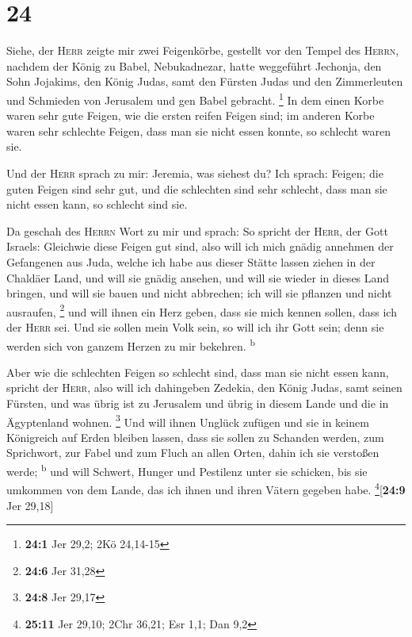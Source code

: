 \hypertarget{section-23}{%
\section{24}\label{section-23}}

 Siehe, der \textsc{Herr} zeigte mir zwei Feigenkörbe,
gestellt vor den Tempel des \textsc{Herrn}, nachdem der König zu Babel,
Nebukadnezar, hatte weggeführt Jechonja, den Sohn Jojakims, den König
Judas, samt den Fürsten Judas und den Zimmerleuten und Schmieden von
Jerusalem und gen Babel gebracht. \footnote{\textbf{24:1} Jer 29,2; 2Kö
  24,14-15}  In dem einen Korbe waren sehr gute Feigen,
wie die ersten reifen Feigen sind; im anderen Korbe waren sehr schlechte
Feigen, dass man sie nicht essen konnte, so schlecht waren sie.

 Und der \textsc{Herr} sprach zu mir: Jeremia, was siehest
du? Ich sprach: Feigen; die guten Feigen sind sehr gut, und die
schlechten sind sehr schlecht, dass man sie nicht essen kann, so
schlecht sind sie.

 Da geschah des \textsc{Herrn} Wort zu mir und sprach:
 So spricht der \textsc{Herr}, der Gott Israels: Gleichwie
diese Feigen gut sind, also will ich mich gnädig annehmen der Gefangenen
aus Juda, welche ich habe aus dieser Stätte lassen ziehen in der
Chaldäer Land,  und will sie gnädig ansehen, und will sie
wieder in dieses Land bringen, und will sie bauen und nicht abbrechen;
ich will sie pflanzen und nicht ausraufen, \footnote{\textbf{24:6} Jer
  31,28}  und will ihnen ein Herz geben, dass sie mich
kennen sollen, dass ich der \textsc{Herr} sei. Und sie sollen mein Volk
sein, so will ich ihr Gott sein; denn sie werden sich von ganzem Herzen
zu mir bekehren. \textsuperscript{b}

 Aber wie die schlechten Feigen so schlecht sind, dass man
sie nicht essen kann, spricht der \textsc{Herr}, also will ich
dahingeben Zedekia, den König Judas, samt seinen Fürsten, und was übrig
ist zu Jerusalem und übrig in diesem Lande und die in Ägyptenland
wohnen. \footnote{\textbf{24:8} Jer 29,17}  Und will ihnen
Unglück zufügen und sie in keinem Königreich auf Erden bleiben lassen,
dass sie sollen zu Schanden werden, zum Sprichwort, zur Fabel und zum
Fluch an allen Orten, dahin ich sie verstoßen werde; \textsuperscript{b}
 und will Schwert, Hunger und Pestilenz unter sie
schicken, bis sie umkommen von dem Lande, das ich ihnen und ihren Vätern
gegeben habe. \footnote{\textbf{25:11} Jer 29,10; 2Chr 36,21; Esr 1,1;
  Dan 9,2}{[}\textbf{24:9} Jer 29,18{]}

